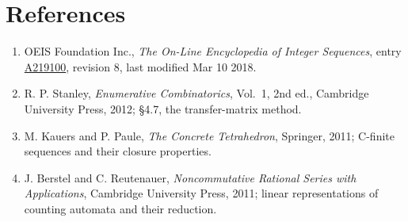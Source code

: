 \documentclass[11pt]{article}
\theoremstyle{definition}
\begin{document}
\section{References}

\begin{enumerate}

\item OEIS Foundation Inc., \emph{The On-Line Encyclopedia of Integer Sequences}, entry \href{https://oeis.org/A219100}{A219100}, revision 8, last modified Mar 10 2018.

\item R. P. Stanley, \emph{Enumerative Combinatorics}, Vol.~1, 2nd ed., Cambridge University Press, 2012; \S4.7, the transfer-matrix method.

\item M. Kauers and P. Paule, \emph{The Concrete Tetrahedron}, Springer, 2011; C-finite sequences and their closure properties.

\item J. Berstel and C. Reutenauer, \emph{Noncommutative Rational Series with Applications}, Cambridge University Press, 2011; linear representations of counting automata and their reduction.

\end{enumerate}
\end{document}
